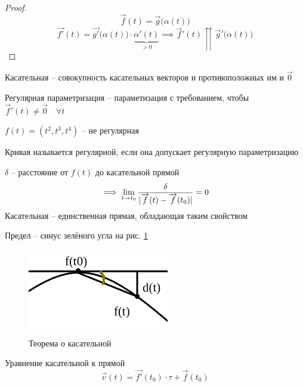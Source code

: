 \begin{proof}
	$$ \vec{f}(t) = \vec{g} \big( \alpha(t) \big) $$
	$$ \vec{f'}(t) = \vec{g'} \big( \alpha(t) \big) \cdot \underbrace{\alpha'(t)}_{> 0} \implies \vec{f}'(t) \upuparrows \vec{g}' \big( \alpha(t) \big) $$
\end{proof}

\begin{definition}
	Касательная -- совокупность касательных векторов и противоположных им и $ \vec{0} $
\end{definition}

\begin{definition}
	Регулярная параметризация -- параметизация с требованием, чтобы $ \vec{f}'(t) \ne \vec{0} \quad \forall t $
\end{definition}

\begin{eg}
	$ f(t) = (t^2, t^3, t^4) $ -- не регулярная
\end{eg}

\begin{definition}
	Кривая называется регулярной, если она допускает регулярную параметризацию
\end{definition}

\begin{theorem}
	$ \delta $ -- расстояние от $ f(t) $ до касательной прямой
	$$ \implies \lim\limits_{t \to t_0} \frac\delta{|\overrightarrow{f}(t) - \overrightarrow{f}(t_0)|} = 0 $$
	Касательная -- единственная прямая, обладающая таким свойством
\end{theorem}

\begin{remark}
	Предел -- синус зелёного угла на рис. \ref{fig:1}
\end{remark}

\begin{figure}[!ht]
	\includegraphics[scale=1]{1}
	\caption{Теорема о касательной}
	\label{fig:1}
\end{figure}

\begin{undefthm}{Уравнение касательной к прямой}
	$$ \vec{v}(t) = \vec{f'}(t_0) \cdot \tau + \vec{f}(t_0) $$
\end{undefthm}

